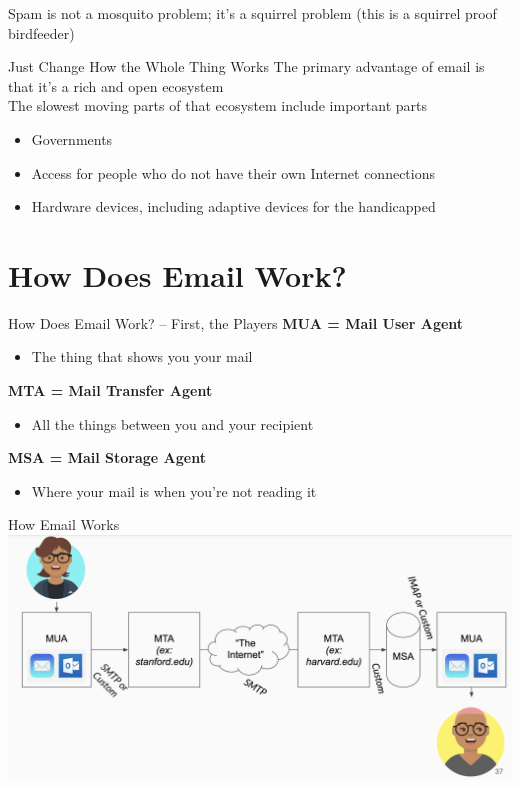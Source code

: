 \documentclass[nobackground,dvipsnames,table,aspectratio=169]{beamer}
\begin{document}
\begin{frame}{Spam is not a mosquito problem; it’s a squirrel problem}
    (this is a squirrel proof birdfeeder)
\end{frame}

\begin{frame}{Just Change How the Whole Thing Works}
    The primary advantage of email is that it’s a rich and open ecosystem\\
    The slowest moving parts of that ecosystem include important parts
    \begin{itemize}
        \item Governments
        \item Access for people who do not have their own Internet connections
        \item Hardware devices, including adaptive devices for the handicapped
    \end{itemize}
\end{frame}

\section{How Does Email Work?}

\begin{frame}{How Does Email Work? – First, the Players}
    \textbf{MUA = Mail User Agent}
    \begin{itemize}
        \item The thing that shows you your mail
    \end{itemize}
    
    \textbf{MTA = Mail Transfer Agent}
    \begin{itemize}
        \item All the things between you and your recipient
    \end{itemize}
    
    \textbf{MSA = Mail Storage Agent}
    \begin{itemize}
        \item Where your mail is when you're not reading it
    \end{itemize}
\end{frame}

\begin{frame}{How Email Works}
    \includegraphics[width=\textwidth]{how-email-works}
\end{frame}
\end{document}
